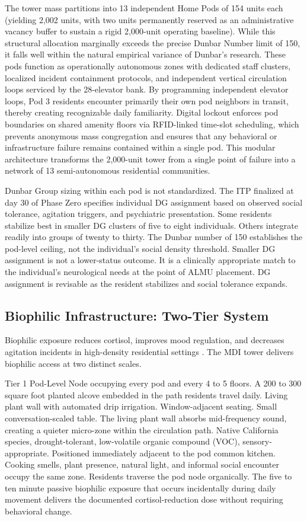 \documentclass[12pt, letterpaper]{article}
\begin{document}
The tower mass partitions into 13 independent Home Pods of 154 units each (yielding 2,002 units, with two units permanently reserved as an administrative vacancy buffer to sustain a rigid 2,000-unit operating baseline). While this structural allocation marginally exceeds the precise Dunbar Number limit of 150, it falls well within the natural empirical variance of Dunbar's research. These pods function as operationally autonomous zones with dedicated staff clusters, localized incident containment protocols, and independent vertical circulation loops serviced by the 28-elevator bank. By programming independent elevator loops, Pod 3 residents encounter primarily their own pod neighbors in transit, thereby creating recognizable daily familiarity. Digital lockout enforces pod boundaries on shared amenity floors via RFID-linked time-slot scheduling, which prevents anonymous mass congregation and ensures that any behavioral or infrastructure failure remains contained within a single pod. This modular architecture transforms the 2,000-unit tower from a single point of failure into a network of 13 semi-autonomous residential communities.

Dunbar Group sizing within each pod is not standardized. The ITP finalized at day 30 of Phase Zero specifies individual DG assignment based on observed social tolerance, agitation triggers, and psychiatric presentation. Some residents stabilize best in smaller DG clusters of five to eight individuals. Others integrate readily into groups of twenty to thirty. The Dunbar number of 150 establishes the pod-level ceiling, not the individual's social density threshold. Smaller DG assignment is not a lower-status outcome. It is a clinically appropriate match to the individual's neurological needs at the point of ALMU placement. DG assignment is revisable as the resident stabilizes and social tolerance expands.

\subsection{Biophilic Infrastructure: Two-Tier System}

Biophilic exposure reduces cortisol, improves mood regulation, and decreases agitation incidents in high-density residential settings \citep{grand_rising_bh_2024, imeg_biophilic_2024}. The MDI tower delivers biophilic access at two distinct scales.

Tier 1 Pod-Level Node occupying every pod and every 4 to 5 floors. A 200 to 300 square foot planted alcove embedded in the path residents travel daily. Living plant wall with automated drip irrigation. Window-adjacent seating. Small conversation-scaled table. The living plant wall absorbs mid-frequency sound, creating a quieter micro-zone within the circulation path. Native California species, drought-tolerant, low-volatile organic compound (VOC), sensory-appropriate. Positioned immediately adjacent to the pod common kitchen. Cooking smells, plant presence, natural light, and informal social encounter occupy the same zone. Residents traverse the pod node organically. The five to ten minute passive biophilic exposure that occurs incidentally during daily movement delivers the documented cortisol-reduction dose without requiring behavioral change.
\end{document}

